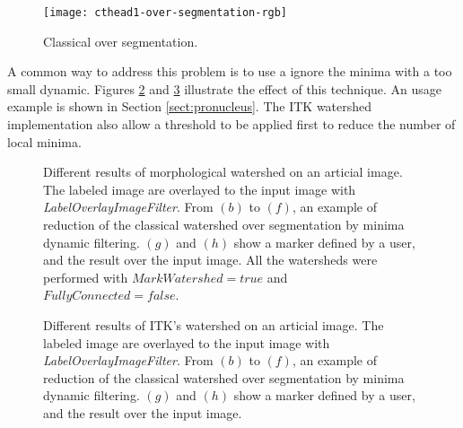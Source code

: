 \documentclass{InsightArticle}
\begin{document}
\begin{figure}
\begin{center}
\texttt{[image: cthead1-over-segmentation-rgb]}
\caption{Classical over segmentation.}
\label{fig:overseg}
\end{center}
\end{figure}

A common way to address this problem is to use a ignore the minima
with a too small dynamic. Figures \ref{fig:artificial-itk} and
\ref{fig:artificial-morpho} illustrate the effect of this technique.
An usage example is shown in Section \ref{sect:pronucleus}.
The ITK watershed implementation also allow a threshold to be applied
first to reduce the number of local minima.

\begin{figure}[htbp]
\begin{center}
\caption{Different results of morphological watershed on an articial image. The labeled image are overlayed to the input image with {\em LabelOverlayImageFilter}. From $(b)$ to $(f)$, an example of reduction of the classical watershed over segmentation by minima dynamic filtering. $(g)$ and $(h)$ show a marker defined by a user, and the result over the input image. All the watersheds were performed with $MarkWatershed = true$ and $FullyConnected = false$.\label{fig:artificial-itk}}
\end{center}
\end{figure}


\begin{figure}[htbp]
\begin{center}
\caption{Different results of ITK's watershed on an articial image. The labeled image are overlayed to the input image with {\em LabelOverlayImageFilter}. From $(b)$ to $(f)$, an example of reduction of the classical watershed over segmentation by minima dynamic filtering. $(g)$ and $(h)$ show a marker defined by a user, and the result over the input image.\label{fig:artificial-morpho}}
\end{center}
\end{figure}
\end{document}
